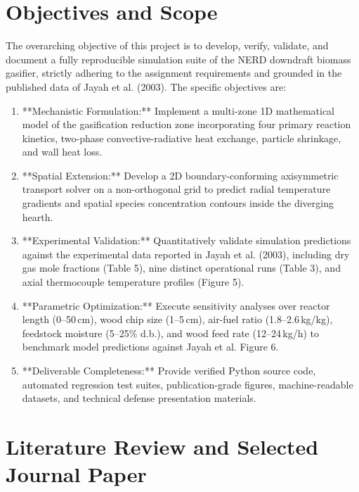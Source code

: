 \documentclass[11pt,a4paper]{article}
\begin{document}
\section{Objectives and Scope}
The overarching objective of this project is to develop, verify, validate, and document a fully reproducible simulation suite of the NERD downdraft biomass gasifier, strictly adhering to the assignment requirements and grounded in the published data of Jayah et al. (2003). The specific objectives are:
\begin{enumerate}[leftmargin=2.0em]
    \item **Mechanistic Formulation:** Implement a multi-zone 1D mathematical model of the gasification reduction zone incorporating four primary reaction kinetics, two-phase convective-radiative heat exchange, particle shrinkage, and wall heat loss.
    \item **Spatial Extension:** Develop a 2D boundary-conforming axisymmetric transport solver on a non-orthogonal grid to predict radial temperature gradients and spatial species concentration contours inside the diverging hearth.
    \item **Experimental Validation:** Quantitatively validate simulation predictions against the experimental data reported in Jayah et al. (2003), including dry gas mole fractions (Table 5), nine distinct operational runs (Table 3), and axial thermocouple temperature profiles (Figure 5).
    \item **Parametric Optimization:** Execute sensitivity analyses over reactor length (0--50\,cm), wood chip size (1--5\,cm), air-fuel ratio (1.8--2.6\,kg/kg), feedstock moisture (5--25\% d.b.), and wood feed rate (12--24\,kg/h) to benchmark model predictions against Jayah et al. Figure 6.
    \item **Deliverable Completeness:** Provide verified Python source code, automated regression test suites, publication-grade figures, machine-readable datasets, and technical defense presentation materials.
\end{enumerate}

\section{Literature Review and Selected Journal Paper}
\end{document}
